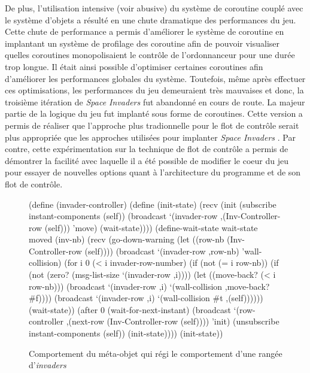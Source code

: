 \documentclass[12pt,twoside,letterpaper,francais]{book}
\newcommand{\si}{{\textit{Space Invaders }}}
\newcommand{\scheme}[1]{\selectlanguage{english}{\tt #1}\selectlanguage{french}}
\begin{document}
De plus, l'utilisation intensive (voir abusive) du système de
coroutine couplé avec le système d'objets a résulté en une chute
dramatique des performances du jeu. Cette chute de performance a
permis d'améliorer le système de coroutine en implantant un système de
profilage des coroutine afin de pouvoir visualiser quelles coroutines
monopolisaient le contrôle de l'ordonnanceur pour une durée trop
longue. Il était ainsi possible d'optimiser certaines coroutines afin
d'améliorer les performances globales du système. Toutefois, même
après effectuer ces optimisations, les performances du jeu demeuraient
très mauvaises et donc, la troisième itération de \si fut abandonné en
cours de route. La majeur partie de la logique du jeu fut implanté
sous forme de coroutines. Cette version a permis de réaliser que
l'approche plus tradionnelle pour le flot de contrôle serait plus
appropriée que les approches utilisées pour implanter \si. Par contre,
cette expérimentation sur la technique de flot de contrôle a permis de
démontrer la facilité avec laquelle il a été possible de modifier le
coeur du jeu pour essayer de nouvelles options quant à l'architecture
du programme et de son flot de contrôle.

\begin{figure}[htb!]
  \begin{schemecode}
(define (invader-controller)
  (define (init-state)
    (recv
     (init
      (subscribe instant-components (self))
      (broadcast `(invader-row ,(Inv-Controller-row (self)))
                 'move)
      (wait-state))))
  (define-wait-state wait-state moved (inv-nb)
    (recv
     (go-down-warning
      (let ((row-nb (Inv-Controller-row (self))))
        (broadcast `(invader-row ,row-nb) 'wall-collision)
        (for i 0 (< i invader-row-number)
             (if (not (= i row-nb))
                 (if (not (zero? (msg-list-size `(invader-row ,i))))
                     (let ((move-back? (< i row-nb)))
                       (broadcast `(invader-row ,i)
                                  `(wall-collision ,move-back? \#f))))
                 (broadcast `(invader-row ,i)
                            `(wall-collision  \#t ,(self))))))
      (wait-state))
     (after 0
            (wait-for-next-instant)
            (broadcast `(row-controller
                         ,(next-row (Inv-Controller-row (self))))
                       'init)
            (unsubscribe instant-components (self))
            (init-state))))
  (init-state))
  \end{schemecode}
  \caption{Comportement du méta-objet \scheme{invader-controller} qui
    régi le comportement d'une rangée d'\textit{invaders}}
  \label{Exp:inv-cnt}
\end{figure}
\end{document}
